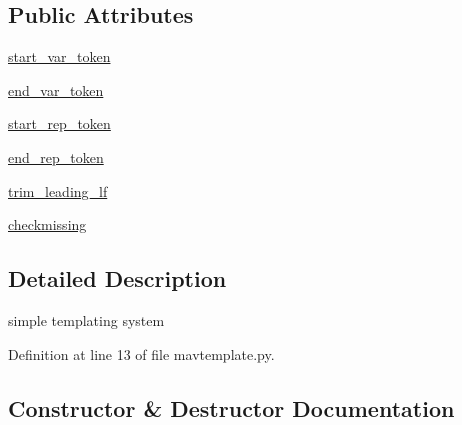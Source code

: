 \subsection*{Public Attributes}
\begin{DoxyCompactItemize}
\item 
\mbox{\hyperlink{classpymavlink_1_1generator_1_1mavtemplate_1_1MAVTemplate_a3c23d8906358f0772059ace68fe51c3b}{start\+\_\+var\+\_\+token}}
\item 
\mbox{\hyperlink{classpymavlink_1_1generator_1_1mavtemplate_1_1MAVTemplate_a3cc7fc0f3ac740977bcbc8374d61237c}{end\+\_\+var\+\_\+token}}
\item 
\mbox{\hyperlink{classpymavlink_1_1generator_1_1mavtemplate_1_1MAVTemplate_aaab90f1760823bf4f248800c3d9ad8e2}{start\+\_\+rep\+\_\+token}}
\item 
\mbox{\hyperlink{classpymavlink_1_1generator_1_1mavtemplate_1_1MAVTemplate_a203012f23c38d0181facaf48ab213ac7}{end\+\_\+rep\+\_\+token}}
\item 
\mbox{\hyperlink{classpymavlink_1_1generator_1_1mavtemplate_1_1MAVTemplate_a5471968b23f4052165d0183b306b707f}{trim\+\_\+leading\+\_\+lf}}
\item 
\mbox{\hyperlink{classpymavlink_1_1generator_1_1mavtemplate_1_1MAVTemplate_ab10ae4c8e485d08cdb59cd51a0952663}{checkmissing}}
\end{DoxyCompactItemize}


\subsection{Detailed Description}
\begin{DoxyVerb}simple templating system\end{DoxyVerb}
 

Definition at line 13 of file mavtemplate.\+py.



\subsection{Constructor \& Destructor Documentation}
\mbox{\label{classpymavlink_1_1generator_1_1mavtemplate_1_1MAVTemplate_ab207ac14ad832a9a2ff313e32a8abf43}} 

